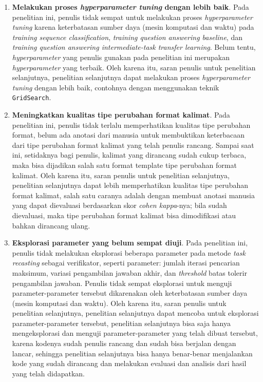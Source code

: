 \begin{enumerate}
    
    \item \textbf{Melakukan proses \emph{hyperparameter tuning} dengan lebih baik}. Pada penelitian ini, penulis tidak sempat untuk melakukan proses \emph{hyperparameter tuning} karena keterbatasan sumber daya (mesin komputasi dan waktu) pada \emph{training sequence classification}, \emph{training question answering baseline}, dan \emph{training question answering intermediate-task transfer learning}. Belum tentu, \emph{hyperparameter} yang penulis gunakan pada penelitian ini merupakan \emph{hyperparameter} yang terbaik. Oleh karena itu, saran penulis untuk penelitian selanjutnya, penelitian selanjutnya dapat melakukan proses \emph{hyperparameter tuning} dengan lebih baik, contohnya dengan menggunakan teknik \texttt{GridSearch}.
    
    \item \textbf{Meningkatkan kualitas tipe perubahan format kalimat}. Pada penelitian ini, penulis tidak terlalu memperhatikan kualitas tipe perubahan format, belum ada anotasi dari manusia untuk membuktikan keterbacaan dari tipe perubahan format kalimat yang telah penulis rancang. Sampai saat ini, setidaknya bagi penulis, kalimat yang dirancang sudah cukup terbaca, maka bisa dijadikan salah satu format template tipe perubahan format kalimat. Oleh karena itu, saran penulis untuk penelitian selanjutnya, penelitian selanjutnya dapat lebih memperhatikan kualitas tipe perubahan format kalimat, salah satu caranya adalah dengan membuat anotasi manusia yang dapat dievaluasi berdasarkan skor \emph{cohen kappa}-nya; bila sudah dievaluasi, maka tipe perubahan format kalimat bisa dimodifikasi atau bahkan dirancang ulang.
    
    \item \textbf{Eksplorasi parameter yang belum sempat diuji}. Pada penelitian ini, penulis tidak melakukan eksplorasi beberapa parameter pada metode \emph{task recasting} sebagai verifikator, seperti parameter: jumlah iterasi pencarian maksimum, variasi pengambilan jawaban akhir, dan \emph{threshold} batas tolerir pengambilan jawaban. Penulis tidak sempat eksplorasi untuk menguji parameter-parameter tersebut dikarenakan oleh keterbatasan sumber daya (mesin komputasi dan waktu). Oleh karena itu, saran penulis untuk penelitian selanjutnya, penelitian selanjutnya dapat mencoba untuk eksplorasi parameter-parameter tersebut, penelitian selanjutnya bisa saja hanya mengeksplorasi dan menguji parameter-parameter yang telah dibuat tersebut, karena kodenya sudah penulis rancang dan sudah bisa berjalan dengan lancar, sehingga penelitian selanjutnya bisa hanya benar-benar menjalankan kode yang sudah dirancang dan melakukan evaluasi dan analisis dari hasil yang telah didapatkan.


\end{enumerate}

